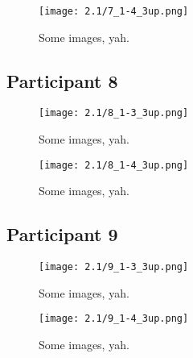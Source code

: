 \begin{figure}[h]
	\begin{center}
	\texttt{[image: 2.1/7\_1-4\_3up.png]}
	\caption{Some images, yah.}
	\end{center}
\end{figure}


\clearpage

\subsection{Participant 8}

\begin{figure}[h]
	\begin{center}
	\texttt{[image: 2.1/8\_1-3\_3up.png]}
	\caption{Some images, yah.}
	\end{center}
\end{figure}

\clearpage

\begin{figure}[h]
	\begin{center}
	\texttt{[image: 2.1/8\_1-4\_3up.png]}
	\caption{Some images, yah.}
	\end{center}
\end{figure}


\clearpage

\subsection{Participant 9}

\begin{figure}[h]
	\begin{center}
	\texttt{[image: 2.1/9\_1-3\_3up.png]}
	\caption{Some images, yah.}
	\end{center}
\end{figure}

\clearpage

\begin{figure}[h]
	\begin{center}
	\texttt{[image: 2.1/9\_1-4\_3up.png]}
	\caption{Some images, yah.}
	\end{center}
\end{figure}

